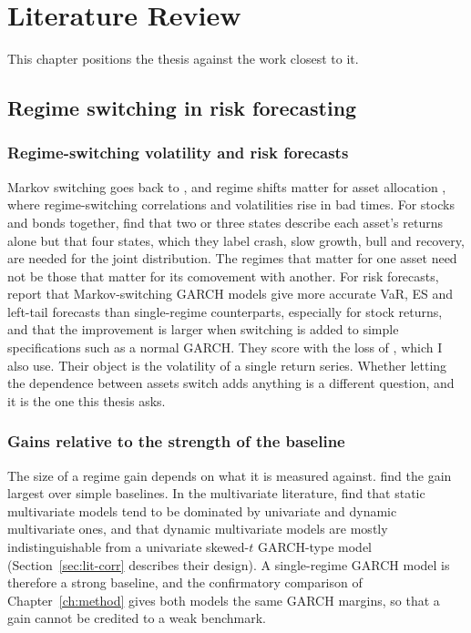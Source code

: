 \section{Literature Review}\label{ch:lit}

This chapter positions the thesis against the work closest to it.

\subsection{Regime switching in risk forecasting}

\subsubsection{Regime-switching volatility and risk forecasts}\label{sec:lit-ms}

Markov switching goes back to \citet{hamilton1989}, and regime shifts matter for asset allocation \citep{ang2002}, where regime-switching correlations and volatilities rise in bad times. For stocks and bonds together, \citet{guidolin2006} find that two or three states describe each asset's returns alone but that four states, which they label crash, slow growth, bull and recovery, are needed for the joint distribution. The regimes that matter for one asset need not be those that matter for its comovement with another. For risk forecasts, \citet{ardia2018} report that Markov-switching GARCH models give more accurate VaR, ES and left-tail forecasts than single-regime counterparts, especially for stock returns, and that the improvement is larger when switching is added to simple specifications such as a normal GARCH. They score with the loss of \citet{patton2019}, which I also use. Their object is the volatility of a single return series. Whether letting the dependence between assets switch adds anything is a different question, and it is the one this thesis asks.

\subsubsection{Gains relative to the strength of the baseline}\label{sec:lit-baseline}

The size of a regime gain depends on what it is measured against. \citet{ardia2018} find the gain largest over simple baselines. In the multivariate literature, \citet{fortin2023} find that static multivariate models tend to be dominated by univariate and dynamic multivariate ones, and that dynamic multivariate models are mostly indistinguishable from a univariate skewed-$t$ GARCH-type model (Section~\ref{sec:lit-corr} describes their design). A single-regime GARCH model is therefore a strong baseline, and the confirmatory comparison of Chapter~\ref{ch:method} gives both models the same GARCH margins, so that a gain cannot be credited to a weak benchmark.

